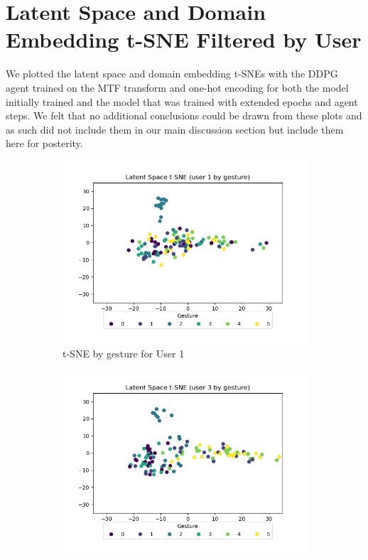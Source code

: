 \chapter{Latent Space and Domain Embedding t-SNE Filtered by User}

We plotted the latent space and domain embedding t-SNEs with the DDPG agent trained on the MTF transform and one-hot encoding for both the model initially trained and the model that was trained with extended epochs and agent steps.
We felt that no additional conclusions could be drawn from these plots and as such did not include them in our main discussion section but include them here for posterity.

\begin{figure}[b]
	\centering
	\begin{subfigure}{0.3\textwidth}
		\centering
		\includegraphics[width=\textwidth]{figures/short/short_ls_u1}
		\caption{t-SNE by gesture for User 1}
	\end{subfigure}
	\hfill
	\begin{subfigure}{0.3\textwidth}
		\centering
		\includegraphics[width=\textwidth]{figures/short/short_ls_u3}

\end{subfigure}
\end{figure}
